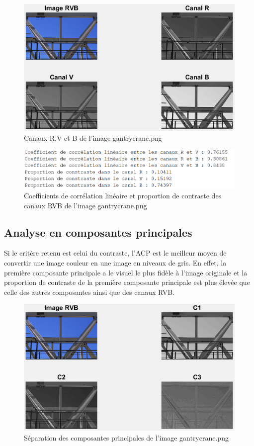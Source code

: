\documentclass[a4paper,12pt]{article}
\theoremstyle{break}
\begin{document}
\begin{figure}[htbp]
	\centering
	\includegraphics[scale=0.55]{img/TP1_ex1_figure_gantrycrane.PNG}
	\caption{Canaux R,V et B de l'image gantrycrane.png}
\end{figure}

\begin{figure}[htbp]
	\centering
	\includegraphics{img/TP1_ex1_res2.PNG}
	\caption{Coefficients de corrélation linéaire et proportion de contraste des canaux RVB de l'image gantrycrane.png}
\end{figure}

\subsection{Analyse en composantes principales}

Si le critère retenu est celui du contraste, l'ACP est le meilleur moyen de convertir une image couleur en une image en niveaux de gris. En effet, la première composante principale a le visuel le plus fidèle à l'image originale et la proportion de contraste de la première composante principale est plus élevée que celle des autres composantes ainsi que des canaux RVB.

\begin{figure}[htbp]
	\centering
	\includegraphics[scale=0.6]{img/TP1_ex2_figure_gantrycrane.PNG}
	\caption{Séparation des composantes principales de l'image gantrycrane.png}
\end{figure}
\end{document}

